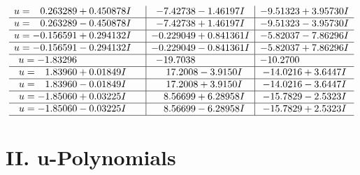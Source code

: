 \documentclass[1p]{elsarticle_modified}
\theoremstyle{definition}
\begin{document}
$$\begin{array}{c|c|c}
\begin{aligned}
u &= \phantom{-}0.263289 + 0.450878 I\end{aligned}
 & -7.42738 - 1.46197 I & -9.51323 + 3.95730 I \\ \hline\begin{aligned}
u &= \phantom{-}0.263289 - 0.450878 I\end{aligned}
 & -7.42738 + 1.46197 I & -9.51323 - 3.95730 I \\ \hline\begin{aligned}
u &= -0.156591 + 0.294132 I\end{aligned}
 & -0.229049 + 0.841361 I & -5.82037 - 7.86296 I \\ \hline\begin{aligned}
u &= -0.156591 - 0.294132 I\end{aligned}
 & -0.229049 - 0.841361 I & -5.82037 + 7.86296 I \\ \hline\begin{aligned}
u &= -1.83296\phantom{ +0.000000I}\end{aligned}
 & -19.7038\phantom{ +0.000000I} & -10.2700\phantom{ +0.000000I} \\ \hline\begin{aligned}
u &= \phantom{-}1.83960 + 0.01849 I\end{aligned}
 & \phantom{-}17.2008 - 3.9150 I & -14.0216 + 3.6447 I \\ \hline\begin{aligned}
u &= \phantom{-}1.83960 - 0.01849 I\end{aligned}
 & \phantom{-}17.2008 + 3.9150 I & -14.0216 - 3.6447 I \\ \hline\begin{aligned}
u &= -1.85060 + 0.03225 I\end{aligned}
 & \phantom{-}8.56699 + 6.28958 I & -15.7829 - 2.5323 I \\ \hline\begin{aligned}
u &= -1.85060 - 0.03225 I\end{aligned}
 & \phantom{-}8.56699 - 6.28958 I & -15.7829 + 2.5323 I\\
 \hline 
 \end{array}$$\newpage
\newpage\renewcommand{\arraystretch}{1}
\centering \section*{ II. u-Polynomials}
\end{document}
